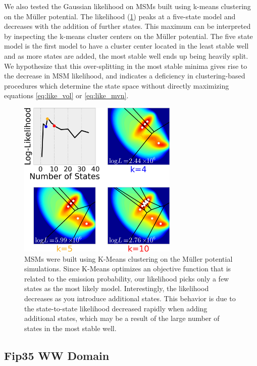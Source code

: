 \documentclass[twocolumn,floatfix,nofootinbib,aps]{revtex4-1}
\begin{document}
We also tested the Gaussian likelihood on MSMs built using k-means clustering on the M\"uller potential. The likelihood (\cref{fig:kmeans_mull}) peaks at a five-state model and decreases with the addition of further states. This maximum can be interpreted by inspecting the k-means cluster centers on the M\"uller potential. The five state model is the first model to have a cluster center located in the least stable well and as more states are added, the most stable well ends up being heavily split. We hypothesize that this over-splitting in the most stable minima gives rise to the decrease in MSM likelihood, and indicates a deficiency in clustering-based procedures which determine the state space without directly maximizing equations \ref{eq:like_vol} or \ref{eq:like_mvn}.

\begin{figure}
\centering
\includegraphics[width=3in]{figs/kmeans_vor_like.png}
\caption{MSMs were built using K-Means clustering on the M\"uller potential simulations. Since K-Means optimizes an objective function that is related to the emission probability, our likelihood picks only a few states as the most likely model. Interestingly, the likelihood decreases as you introduce additional states. This behavior is due to the state-to-state likelihood decreased rapidly when adding additional states, which may be a result of the large number of states in the most stable well.}
\label{fig:kmeans_mull}
\end{figure}

\subsection{Fip35 WW Domain}
\end{document}
